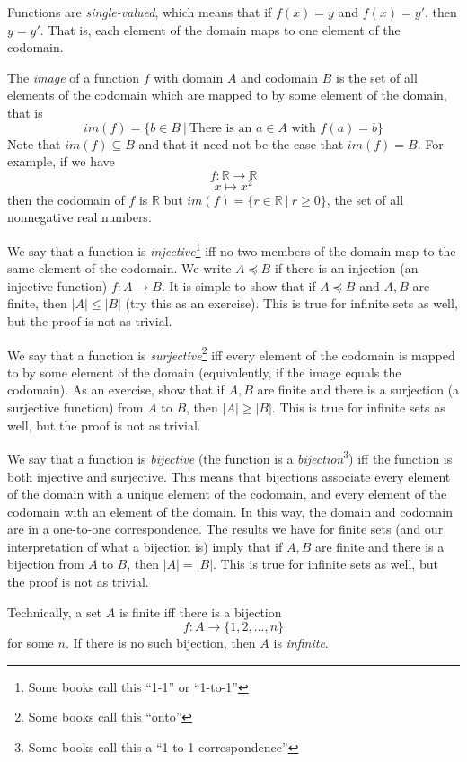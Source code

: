Functions are \emph{single-valued}, which means that if $f(x) = y$ and $f(x) = y'$, then $y = y'$. That is, each element of the domain maps to one element of the codomain. 

The \emph{image} of a function $f$ with domain $A$ and codomain $B$ is the set of all elements of the codomain which are mapped to by some element of the domain, that is
\[
   im(f) = \{b \in B\ |\ \text{There is an } a \in A \text{ with } f(a) = b\}
 \] 
Note that $im(f) \subseteq B$ and that it need not be the case that $im(f) = B$. For example, if we have 
\[
  f : \mathbb{R} \rightarrow \mathbb{R}
\]
\[
  x \mapsto x^2
\]
then the codomain of $f$ is $\mathbb{R}$ but $im(f) = \{r \in \mathbb{R}\ |\ r \geq 0\}$, the set of all nonnegative real numbers. 

We say that a function is \emph{injective}\footnote{Some books call this ``1-1'' or ``1-to-1''} iff no two members of the domain map to the same element of the codomain. We write $A \preceq B$ if there is an injection (an injective function) $f: A \rightarrow B$. It is simple to show that if $A \preceq B$ and $A, B$ are finite, then $|A| \leq |B|$ (try this as an exercise). This is true for infinite sets as well, but the proof is not as trivial. 

We say that a function is \emph{surjective}\footnote{Some books call this ``onto''} iff every element of the codomain is mapped to by some element of the domain (equivalently, if the image equals the codomain). As an exercise, show that if $A, B$ are finite and there is a surjection (a surjective function) from $A$ to $B$, then $|A| \geq |B|$. This is true for infinite sets as well, but the proof is not as trivial. 

We say that a function is \emph{bijective} (the function is a \emph{bijection}\footnote{Some books call this a ``1-to-1 correspondence''}) iff the function is both injective and surjective. This means that bijections associate every element of the domain with a unique element of the codomain, and every element of the codomain with an element of the domain. In this way, the domain and codomain are in a one-to-one correspondence. The results we have for finite sets (and our interpretation of what a bijection is) imply that if $A, B$ are finite and there is a bijection from $A$ to $B$, then $|A| = |B|$. This is true for infinite sets as well, but the proof is not as trivial. 

Technically, a set $A$ is finite iff there is a bijection 
\[
  f: A \rightarrow \{1, 2,...,n\}
\]
for some $n$. If there is no such bijection, then $A$ is \emph{infinite}. 

